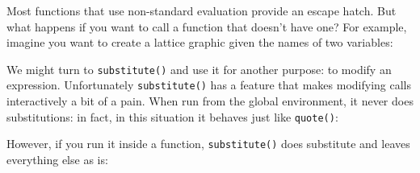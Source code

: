 
Most functions that use non-standard evaluation provide an escape hatch.
But what happens if you want to call a function that doesn't have one?
For example, imagine you want to create a lattice graphic given the
names of two variables: 

\begin{Shaded}
\begin{Highlighting}[]
\StringTok{ } 

\StringTok{ }
\StringTok{ }
\StringTok{ } 
\end{Highlighting}
\end{Shaded}

We might turn to \texttt{substitute()} and use it for another purpose:
to modify an expression. Unfortunately \texttt{substitute()} has a
feature that makes modifying calls interactively a bit of a pain. When
run from the global environment, it never does substitutions: in fact,
in this situation it behaves just like \texttt{quote()}:

\begin{Shaded}
\begin{Highlighting}[]
\StringTok{ }
\StringTok{ }
\StringTok{ }\StringTok{ }
\end{Highlighting}
\end{Shaded}

However, if you run it inside a function, \texttt{substitute()} does
substitute and leaves everything else as is:

\begin{Shaded}
\begin{Highlighting}[]
\StringTok{ }
  \StringTok{ }
  \StringTok{ }
  \StringTok{ }\StringTok{ }
\NormalTok{\}}
\NormalTok{()}
\end{Highlighting}
\end{Shaded}

